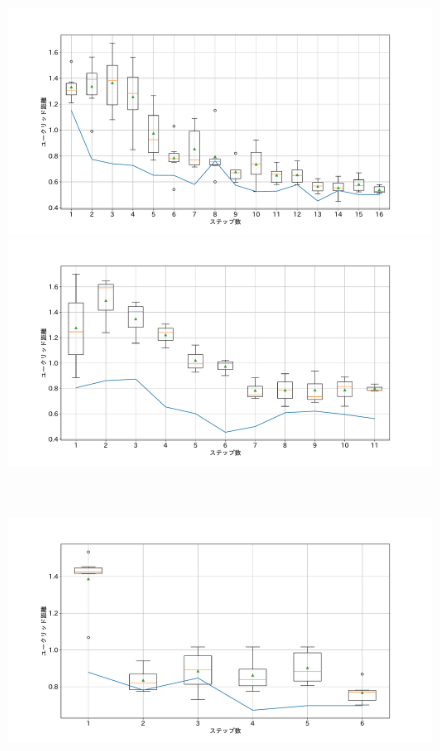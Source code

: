 \begin{figure}[h]
 \begin{minipage}[b]{0.48\linewidth}
  \centering
  \includegraphics[scale=0.15]{./imgs/gaChange/cake1_5.pdf}
 \end{minipage}
 \begin{minipage}[b]{0.48\linewidth}
  \centering
  \includegraphics[scale=0.15]{./imgs/gaChange/cake2_5.pdf}
 \end{minipage}\\
 \begin{minipage}[b]{0.48\linewidth}
  \centering
  \includegraphics[scale=0.15]{./imgs/gaChange/cake1_6.pdf}

\end{minipage}
\end{figure}
